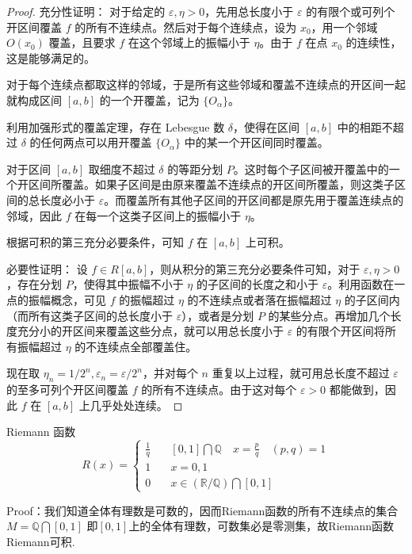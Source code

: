 \documentclass[lang=cn,12pt]{elegantbook}
\begin{document}
\begin{proof}
    充分性证明：
    对于给定的 \( \varepsilon, \eta > 0 \)，先用总长度小于 \( \varepsilon \) 的有限个或可列个开区间覆盖 \( f \) 的所有不连续点。然后对于每个连续点，设为 \( x_0 \)，用一个邻域 \( O(x_0) \) 覆盖，且要求 \( f \) 在这个邻域上的振幅小于 \( \eta \)。由于 \( f \) 在点 \( x_0 \) 的连续性，这是能够满足的。

    对于每个连续点都取这样的邻域，于是所有这些邻域和覆盖不连续点的开区间一起就构成区间 \([a, b]\) 的一个开覆盖，记为 \(\{O_\alpha\}\)。

    利用加强形式的覆盖定理，存在 Lebesgue 数 \( \delta \)，使得在区间 \([a, b]\) 中的相距不超过 \( \delta \) 的任何两点可以用开覆盖 \(\{O_\alpha\}\) 中的某一个开区间同时覆盖。

    对于区间 \([a, b]\) 取细度不超过 \( \delta \) 的等距分划 \( P \)。这时每个子区间被开覆盖中的一个开区间所覆盖。如果子区间是由原来覆盖不连续点的开区间所覆盖，则这类子区间的总长度必小于 \( \varepsilon \)。而覆盖所有其他子区间的开区间都是原先用于覆盖连续点的邻域，因此 \( f \) 在每一个这类子区间上的振幅小于 \( \eta \)。

    根据可积的第三充分必要条件，可知 \( f \) 在 \([a, b]\) 上可积。

    必要性证明：
    设 \( f \in R[a, b] \)，则从积分的第三充分必要条件可知，对于 \( \varepsilon, \eta > 0 \)，存在分划 \( P \)，使得其中振幅不小于 \( \eta \) 的子区间的长度之和小于 \( \varepsilon \)。利用函数在一点的振幅概念，可见 \( f \) 的振幅超过 \( \eta \) 的不连续点或者落在振幅超过 \( \eta \) 的子区间内（而所有这类子区间的总长度小于 \( \varepsilon \)），或者是分划 \( P \) 的某些分点。再增加几个长度充分小的开区间来覆盖这些分点，就可以用总长度小于 \( \varepsilon \) 的有限个开区间将所有振幅超过 \( \eta \) 的不连续点全部覆盖住。

    现在取 \( \eta_n = 1/2^n, \varepsilon_n = \varepsilon/2^n \)，并对每个 \( n \) 重复以上过程，就可用总长度不超过 \( \varepsilon \) 的至多可列个开区间覆盖 \( f \) 的所有不连续点。由于这对每个 \( \varepsilon > 0 \) 都能做到，因此 \( f \) 在 \([a, b]\) 上几乎处处连续。
\end{proof}

\begin{example}
    Riemann 函数
    \[
    R(x) = 
    \begin{cases}
        \frac{1}{q} \quad &[0,1] \bigcap \mathbb{Q} \quad x = \frac{p}{q} \quad (p,q) = 1\\
        1 \quad &x = 0,1 \\
        0 \quad & x \in (\mathbb{R} /\mathbb{Q} ) \bigcap  [0,1]
    \end{cases}
    \]
\end{example}
Proof：我们知道全体有理数是可数的，因而Riemann函数的所有不连续点的集合$M = \mathbb{Q} \bigcap [0,1]$ 即$[0,1]$上的全体有理数，可数集必是零测集，故Riemann函数Riemann可积.
\end{document}
